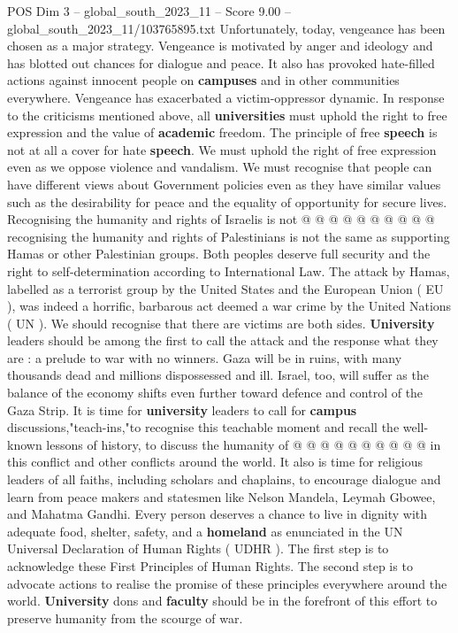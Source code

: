 \begin{textsample}{POS Dim 3 – global\_south\_2023\_11 – Score 9.00 – global\_south\_2023\_11/103765895.txt}
Unfortunately, today, vengeance has been chosen as a major strategy.
Vengeance is motivated by anger and ideology and has blotted out chances for dialogue and peace.
It also has provoked hate-filled actions against innocent people on \textbf{campuses} and in other communities everywhere.
Vengeance has exacerbated a victim-oppressor dynamic.
In response to the criticisms mentioned above, all \textbf{universities} must uphold the right to free expression and the value of \textbf{academic} freedom.
The principle of free \textbf{speech} is not at all a cover for hate \textbf{speech}.
We must uphold the right of free expression even as we oppose violence and vandalism.
We must recognise that people can have different views about Government policies even as they have similar values such as the desirability for peace and the equality of opportunity for secure lives.
Recognising the humanity and rights of Israelis is not @ @ @ @ @ @ @ @ @ @ recognising the humanity and rights of Palestinians is not the same as supporting Hamas or other Palestinian groups.
Both peoples deserve full security and the right to self-determination according to International Law.
The attack by Hamas, labelled as a terrorist group by the United States and the European Union ( EU ), was indeed a horrific, barbarous act deemed a war crime by the United Nations ( UN ).
We should recognise that there are victims are both sides. \textbf{University} leaders should be among the first to call the attack and the response what they are : a prelude to war with no winners.
Gaza will be in ruins, with many thousands dead and millions dispossessed and ill.
Israel, too, will suffer as the balance of the economy shifts even further toward defence and control of the Gaza Strip.
It is time for \textbf{university} leaders to call for \textbf{campus} discussions,"teach-ins,"to recognise this teachable moment and recall the well-known lessons of history, to discuss the humanity of @ @ @ @ @ @ @ @ @ @ in this conflict and other conflicts around the world.
It also is time for religious leaders of all faiths, including scholars and chaplains, to encourage dialogue and learn from peace makers and statesmen like Nelson Mandela, Leymah Gbowee, and Mahatma Gandhi.
Every person deserves a chance to live in dignity with adequate food, shelter, safety, and a \textbf{homeland} as enunciated in the UN Universal Declaration of Human Rights ( UDHR ).
The first step is to acknowledge these First Principles of Human Rights.
The second step is to advocate actions to realise the promise of these principles everywhere around the world. \textbf{University} dons and \textbf{faculty} should be in the forefront of this effort to preserve humanity from the scourge of war.

\end{textsample}
